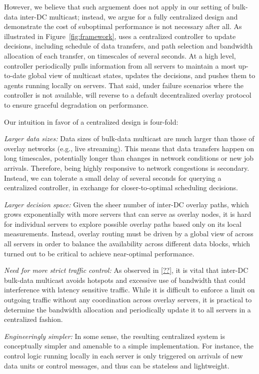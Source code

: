 However, we believe that such arguement does not apply in our
setting of bulk-data inter-DC multicast; instead, we argue for
a fully centralized design and demonstrate the cost of
suboptimal performance is not necessary after all.
As illustrated in Figure~\ref{fig:framework}, \name uses a centralized controller to update decisions,
including schedule of data transfers, and path selection and
bandwidth allocation of each transfer, on timescales of
several seconds.
At a high level, \name controller periodically pulls information
from all servers to maintain a most up-to-date global view of
multicast states, updates the decisions, and pushes them
to agents running locally on servers.
That said, under failure scenarios where the controller is
not available, \name will reverse to a default decentralized
overlay protocol to ensure graceful degradation on performance.

Our intuition in favor of a centralized design is four-fold:
\begin{packedenumerate}
\item {\em Larger data sizes:}
Data sizes of bulk-data multicast are much larger
than those of overlay networks (e.g., live streaming).
This means that data transfers happen on long timescales,
potentially longer than changes in network conditions or
new job arrivals.
Therefore, being highly responsive to network congestions
is secondary.
Instead, we can tolerate a small delay of several seconds for
querying a centralized controller,
in exchange for closer-to-optimal scheduling decisions.
\item {\em Larger decision space:}
Given the sheer number of inter-DC overlay paths,
which grows exponentially with more servers that can
serve as overlay nodes,
it is hard for individual servers to explore possible overlay
paths based only on its local measurements.
Instead, overlay routing must be driven by a global
view of across all servers in order to
balance the availability across different data blocks, which
turned out to be critical to achieve near-optimal performance.
\item {\em Need for more strict traffic control:}
As observed in \Section\ref{??}, it is vital that inter-DC
bulk-data multicast avoids hotspots and excessive use of
bandwidth that could interference with latency sensitive traffic.
While it is difficult to enforce a limit on outgoing traffic
without any coordination across overlay servers, it is practical
to determine the bandwidth allocation and periodically update it
to all servers in a centralized fashion.
\item {\em Engineeringly simpler:}
In some sense, the resulting centralized system is conceptually
simpler and amenable to a simple implementation.
For instance, the control logic running locally in each server
is only triggered on arrivals of new data units or control messages,
and thus can be stateless and lightweight.

\end{packedenumerate}

